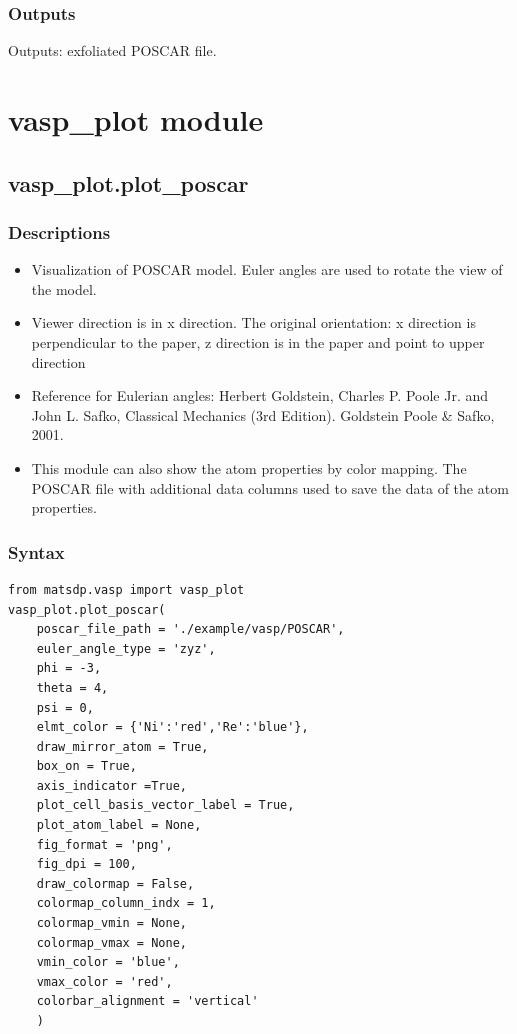 \documentclass[12pt]{book}
\begin{document}
\subsubsection{Outputs}
Outputs: exfoliated POSCAR file.


\section{vasp\_plot module}
\subsection{vasp\_plot.plot\_poscar}
\subsubsection{Descriptions}
\begin{itemize}
\item Visualization of POSCAR model. Euler angles are used to rotate the view of the model.
\item Viewer direction is in x direction. The original orientation: x direction is perpendicular to the paper, z direction is in the paper and point to upper direction
\item Reference for Eulerian angles: Herbert Goldstein, Charles P. Poole Jr. and John L. Safko, Classical Mechanics (3rd Edition). Goldstein Poole \& Safko, 2001.
\item This module can also show the atom properties by color mapping. The POSCAR file with additional data columns used to save the data of the atom properties.
\end{itemize}

\subsubsection{Syntax}
\begin{lstlisting}
from matsdp.vasp import vasp_plot
vasp_plot.plot_poscar(
    poscar_file_path = './example/vasp/POSCAR',
    euler_angle_type = 'zyz',
    phi = -3,
    theta = 4,
    psi = 0,
    elmt_color = {'Ni':'red','Re':'blue'},
    draw_mirror_atom = True,
    box_on = True,
    axis_indicator =True,
    plot_cell_basis_vector_label = True,
    plot_atom_label = None,
    fig_format = 'png',
    fig_dpi = 100,
    draw_colormap = False,
    colormap_column_indx = 1,
    colormap_vmin = None,
    colormap_vmax = None,
    vmin_color = 'blue',
    vmax_color = 'red',
    colorbar_alignment = 'vertical'
	)
\end{lstlisting}
\end{document}
